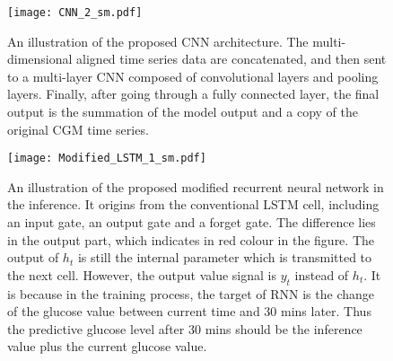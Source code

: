 \documentclass[a4paper, 10 pt, twocolumn]{IEEEtran}
\begin{document}
  \begin{figure}[h]
  \texttt{[image: CNN\_2\_sm.pdf]} %
  \centering
  \caption{An illustration of the proposed CNN architecture. The multi-dimensional aligned time series data are concatenated, and then sent to a multi-layer CNN composed of convolutional layers and pooling layers.
  Finally, after going through a fully connected layer, the final output is the summation of the model output and a copy of the original CGM time series.  }\label{fig:cnn_1}
  \centering
 \end{figure}

  \begin{figure*}[t]
  \texttt{[image: Modified\_LSTM\_1\_sm.pdf]} %
  \centering
  \caption{An illustration of the proposed modified recurrent neural network in the inference. It origins from the conventional LSTM cell, including an input gate, an output gate and a forget gate. The difference lies in
  the output part, which indicates in red colour in the figure. The output of $h_t$ is still the internal parameter which is transmitted to the next cell. However, the output value signal is $y_t$ instead of $h_t$. It is
  because in the training process, the target of RNN is the change of the glucose value between current time and 30 mins later. Thus the predictive glucose level after 30 mins should be the inference value plus the
  current glucose value.}\label{fig:lstm_chain}
  \centering
 \end{figure*}
\end{document}
